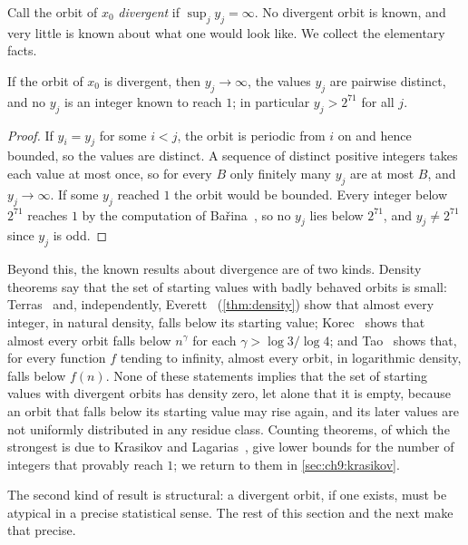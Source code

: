 Call the orbit of $x_0$ \emph{divergent} if $\sup_jy_j=\infty$. No divergent
orbit is known, and very little is known about what one would look like. We
collect the elementary facts.

\begin{lemma}\label{lem:ch9:infinity}
If the orbit of $x_0$ is divergent, then $y_j\to\infty$, the values $y_j$ are
pairwise distinct, and no $y_j$ is an integer known to reach $1$; in
particular $y_j>2^{71}$ for all $j$.
\end{lemma}

\begin{proof}
If $y_i=y_j$ for some $i<j$, the orbit is periodic from $i$ on and hence
bounded, so the values are distinct. A sequence of distinct positive integers
takes each value at most once, so for every $B$ only finitely many $y_j$ are at
most $B$, and $y_j\to\infty$. If some $y_j$ reached $1$ the orbit would be
bounded. Every integer below $2^{71}$ reaches $1$ by the computation of
Ba\v{r}ina~\cite{barina2025}, so no $y_j$ lies below $2^{71}$, and $y_j\neq2^{71}$ since $y_j$ is odd.
\end{proof}

Beyond this, the known results about divergence are of two kinds. Density
theorems say that the set of starting values with badly behaved orbits is
small: Terras~\cite{terras1976,terras1979} and, independently,
Everett~\cite{everett1977} (\cref{thm:density}) show that almost every integer, in natural
density, falls below its starting value; Korec~\cite{korec1994} shows that
almost every orbit falls below $n^{\gamma}$ for each $\gamma>\log3/\log4$; and
Tao~\cite[Theorem~1.3]{tao2022} shows that, for every function $f$ tending to
infinity, almost every orbit, in logarithmic density, falls below $f(n)$. None of these statements implies that
the set of starting values with divergent orbits has density zero, let alone
that it is empty, because an orbit that falls below its starting value may rise
again, and its later values are not uniformly distributed in any residue
class. Counting theorems, of which the strongest is due to Krasikov and
Lagarias~\cite{krasikov2003}, give lower bounds for the number of integers that
provably reach $1$; we return to them in \cref{sec:ch9:krasikov}.

The second kind of result is structural: a divergent orbit, if one exists,
must be atypical in a precise statistical sense. The rest of this section and
the next make that precise.

